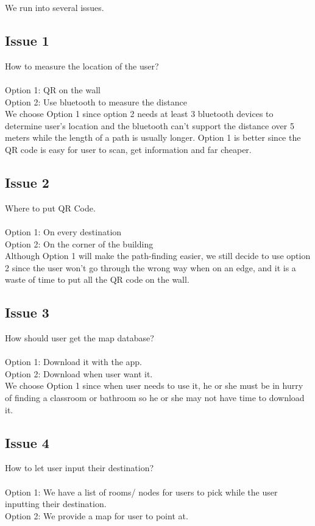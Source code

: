 \documentclass[12pt]{article}
\begin{document}
We run into several issues.



\subsection{Issue 1}
How to measure the location of the user? \\ \\

Option 1: QR on the wall \\
Option 2: Use bluetooth to measure the distance \\

We choose Option 1 since option 2 needs at least 3 bluetooth devices to determine user’s location and the bluetooth can’t support the distance over 5 meters while the length of a path is usually longer. Option 1 is better since the QR code is easy for user to scan, get information and far cheaper.

\subsection{Issue 2}

Where to put QR Code. \\ \\

Option 1: On every destination \\
Option 2: On the corner of the building \\

Although Option 1 will make the path-finding easier, we still decide to use option 2 since the user won’t go through the wrong way when on an edge, and it is a waste of time to put all the QR code on the wall.

\subsection{Issue 3}
How should user get the map database? \\ \\

Option 1: Download it with the app. \\
Option 2: Download when user want it. \\

We choose Option 1 since when user needs to use it, he or she must be in hurry of finding a classroom or bathroom so he or she may not have time to download it. 

\subsection{Issue 4}
How to let user input their destination? \\ \\
Option 1: We have a list of rooms/ nodes for users to pick while the user inputting their destination. \\
Option 2: We provide a map for user to point at. \\
\end{document}
